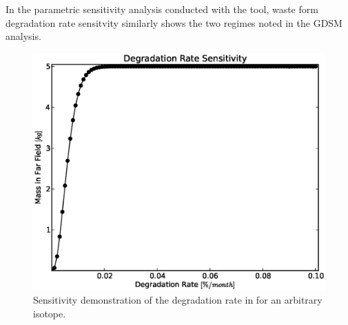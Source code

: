 
In the parametric sensitivity analysis conducted with the \Cyder tool, waste
form degradation rate sensitvity similarly shows the two regimes noted in the
\gls{GDSM} analysis.

\begin{figure}[htbp!]
\begin{center}
\includegraphics[width=0.7\linewidth]{./results/images/WFDegAndInv/deg.eps}
\end{center}
\caption{Sensitivity demonstration of the degradation rate in \Cyder for an
arbitrary isotope.}
\label{fig:deg}
\end{figure}
